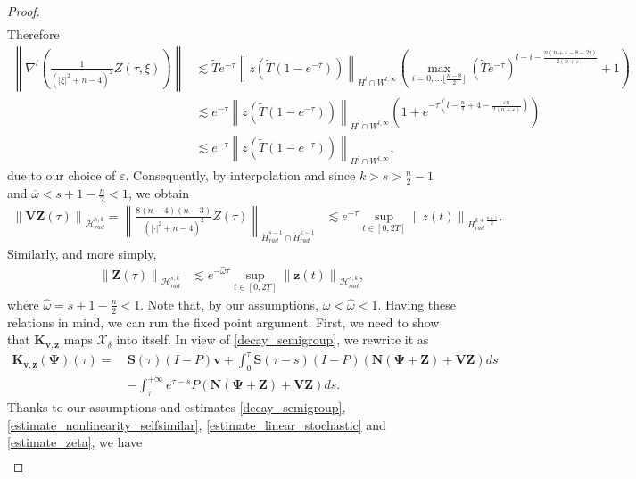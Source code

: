 \documentclass[12pt,reqno]{amsart}
\theoremstyle{plain}
\theoremstyle{remark}
\theoremstyle{plain}
\theoremstyle{definition}
\numberwithin{equation}{section}
\numberwithin{equation}{section}
\newcommand{\norm}[1]{\left\|#1\right\|}
\newcommand{\HH}{\mathcal{H}}
\newcommand{\eps}{\varepsilon}
\begin{document}
\begin{proof}
\begin{align*}
		\end{align*}
		Therefore
		\begin{align*}
			\norm{ \nabla^l\left(\frac{1}{(\lvert\xi\rvert^2+n-4)^2}Z(\tau,\xi)\right)}&\lesssim \tilde{T} e^{-\tau}\norm{z(\tilde{T}(1-e^{-\tau}))}_{H^l\cap W^{l,\infty}}\left(\max_{i=0,\dots \lfloor{\frac{n-8}{2}}\rfloor }(\tilde{T} e^{-\tau})^{l-i-\frac{n(n+\eps-8-2i)}{2(n+\eps)}} +1\right)\\ & \lesssim e^{-\tau}\norm{z(\tilde{T}(1-e^{-\tau}))}_{H^l\cap W^{l,\infty}} \left(1+e^{-\tau(l-\frac{n}{2}+4-\frac{\eps n}{2(n+\eps)})}\right)\\ & \lesssim  e^{-\tau}\norm{z(\tilde{T}(1-e^{-\tau}))}_{H^l\cap W^{l,\infty}} ,
		\end{align*}
		due to our choice of $\eps$. Consequently, by interpolation and since $k>s>\frac{n}{2}-1$ and $\overline{\omega}<s+1-\frac{n}{2}<1$, we obtain
		\begin{align}\label{estimate_linear_stochastic}
			\norm{\mathbf{V}\mathbf{Z}(\tau)}_{\HH_{rad}^{s,k}}=\norm{\frac{8(n-4)(n-3)}{(\lvert \cdot\rvert^2+n-4)^2}Z(\tau)}_{\dot{H}^{s-1}_{rad}\cap \dot{H}^{k-1}_{rad}}&\lesssim e^{-\tau}\sup_{t\in [0,2T]}\norm{ z(t)}_{H^{k+\frac{n+1}{2}}_{rad}}.
		\end{align}
		Similarly, and more simply, 
		\begin{align}\label{estimate_zeta}
			\norm{\mathbf{Z}(\tau)}_{\HH_{rad}^{s,k}}&\lesssim e^{-\hat{\omega}\tau}\sup_{t\in [0,2T]}\norm{\mathbf{z}(t)}_{\HH_{rad}^{s,k}},
		\end{align}
		where $\hat{\omega}=s+1-\frac{n}{2}<1$. Note that, by our assumptions, $\overline{\omega}<\hat{\omega}<1$.
		Having these relations in mind, we can run the fixed point argument. First, we need to show that $\mathbf{K}_{\mathbf{v},\mathbf{z}}$ maps $\mathcal{X}_{\delta}$ into itself. In view of \eqref{decay_semigroup}, we rewrite it as
		\begin{align*}
			\mathbf{K}_{\mathbf{v},\mathbf{z}}(\mathbf{\Psi})(\tau)=\ &\mathbf{S}(\tau)(I-P)\mathbf{v}+\int_0^\tau \mathbf{S}(\tau-s)(I-P)\left(\mathbf{N}(\mathbf{\Psi}+\mathbf{Z})+\mathbf{V}\mathbf{Z} \right) ds  \\ & -\int_{\tau}^{+\infty} e^{\tau-s} P\left(\mathbf{N}(\mathbf{\Psi}+\mathbf{Z})+\mathbf{V}\mathbf{Z} \right) ds.
		\end{align*}
		Thanks to our assumptions and estimates  \eqref{decay_semigroup},  \eqref{estimate_nonlinearity_selfsimilar}, \eqref{estimate_linear_stochastic} and \eqref{estimate_zeta}, we have
		\begin{align*}

\end{align*}
\end{proof}
\end{document}
